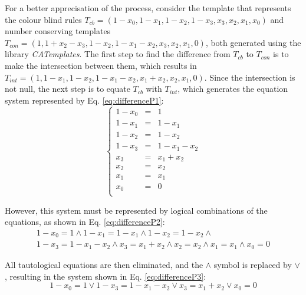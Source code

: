 \documentclass{llncs}
\begin{document}
For a better apprecisation of the process, consider the template that represents the colour blind rules $T_{cb} = (1 - x_0, 1 - x_1, 1 - x_2, 1 - x_3, x_3, x_2, x_1, x_0)$ and number conserving templates $T_{con} = (1, 1 + x_2 - x_3, 1 - x_2, 1 - x_1 - x_2, x_3, x_2, x_1, 0)$, both generated using the library \textit{CATemplates}. The first step to find the difference from $T_{cb}$ to $T_{con}$ is to make the intersection between them, which results in $T_{int} = (1, 1 - x_1, 1 - x_2, 1 - x_1 - x_2, x_1 + x_2, x_2, x_1, 0)$. Since the intersection is not null, the next step is to equate $T_{cb}$ with $T_{int}$, which generates the equation system represented by Eq. \ref{eq:differenceP1}: \begin{equation} \left\{\begin{matrix} 1 - x_0 & = & 1       \\ 1 - x_1  & = & 1 - x_1     \\ 1 - x_2  & = & 1 - x_2     \\ 1 - x_3  & = & 1 - x_1 - x_2 \\
x_3   & = & x_1 + x_2   \\
x_2   & = & x_2       \\
x_1   & = & x_1       \\
x_0   & = & 0       \\
\end{matrix}\right.
\label{eq:differenceP1}
\end{equation}

However, this system must be represented by logical combinations of the equations, as shown in Eq. \ref{eq:differenceP2}:
\begin{equation}
\begin{split}
1 - x_0 = 1       \wedge
1 - x_1 = 1 - x_1   \wedge
1 - x_2 = 1 - x_2   \wedge\\
1 - x_3 = 1 - x_1 - x_2 \wedge 
x_3   = x_1 + x_2   \wedge
x_2   = x_2     \wedge
x_1   = x_1     \wedge
x_0   = 0       
\label{eq:differenceP2}
\end{split}
\end{equation}

All tautological equations are then eliminated, and the $\wedge$ symbol is replaced by $\vee$, resulting in the system shown in Eq. \ref{eq:differenceP3}:
\begin{equation}
1 - x_0 = 1       \vee 
1 - x_3 = 1 - x_1 - x_2 \vee
x_3   = x_1 + x_2   \vee 
x_0   = 0       
\label{eq:differenceP3}
\end{equation}
\end{document}
